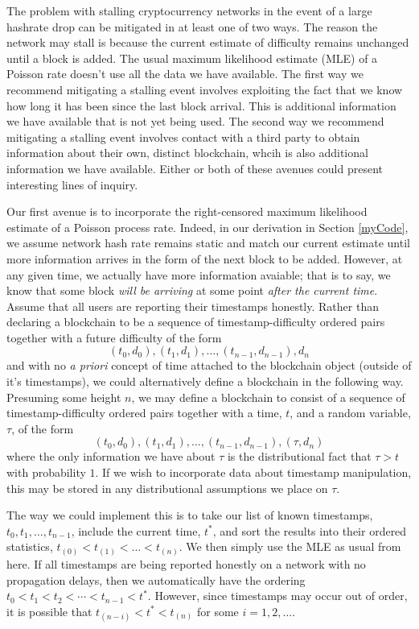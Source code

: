 \documentclass[12pt,english]{mrl}
\theoremstyle{definition}
\numberwithin{equation}{section}
\numberwithin{figure}{section}
\numberwithin{equation}{section}
\numberwithin{equation}{section}
\numberwithin{figure}{section}
\begin{document}
The problem with stalling cryptocurrency networks in the event of a large hashrate drop can be mitigated in at least one of two ways.  The reason the network may stall is because the current estimate of difficulty remains unchanged until a block is added. The usual maximum likelihood estimate (MLE) of a Poisson rate doesn't use all the data we have available. The first way we recommend mitigating a stalling event involves exploiting the fact that we know how long it has been since the last block arrival. This is additional information we have available that is not yet being used. The second way we recommend mitigating a stalling event involves contact with a third party to obtain information about their own, distinct blockchain, whcih is also additional information we have available. Either or both of these avenues could present interesting lines of inquiry.

Our first avenue is to incorporate the right-censored maximum likelihood estimate of a Poisson process rate. Indeed, in our derivation in Section \ref{myCode}, we assume network hash rate remains static and match our current estimate until more information arrives in the form of the next block to be added. However, at any given time, we actually have more information avaiable; that is to say, we know that some block \emph{will be arriving} at some point \emph{after the current time}. Assume that all users are reporting their timestamps honestly. Rather than declaring a blockchain to be a sequence of timestamp-difficulty ordered pairs together with a future difficulty of the form 
\[(t_0, d_0), (t_1, d_1), \ldots, (t_{n-1}, d_{n-1}), d_n\] 
and with no \emph{a priori} concept of time attached to the blockchain object (outside of it's timestamps), we could alternatively define a blockchain in the following way. Presuming some height $n$, we may define a blockchain to consist of a sequence of timestamp-difficulty ordered pairs together with a time, $t$, and a random variable, $\tau$, of the form
\[(t_0, d_0), (t_1, d_1), \ldots, (t_{n-1}, d_{n-1}), (\tau, d_n)\]
where the only information we have about $\tau$ is the distributional fact that $\tau > t$ with probability $1$. If we wish to incorporate data about timestamp manipulation, this may be stored in any distributional assumptions we place on $\tau$.

The way we could implement this is to take our list of known timestamps, $t_0, t_1, \ldots, t_{n-1}$, include the current time, $t^*$, and sort the results into their ordered statistics, $t_{(0)} < t_{(1)} < \ldots < t_{(n)}$. We then simply use the MLE as usual from here. If all timestamps are being reported honestly on a network with no propagation delays, then we automatically have the ordering $t_0 < t_1 < t_2 < \cdots < t_{n-1} < t^*$. However, since timestamps may occur out of order, it is possible that $t_{(n-i)} < t^{*} < t_{(n)}$ for some $i=1, 2, \ldots$.
\end{document}
